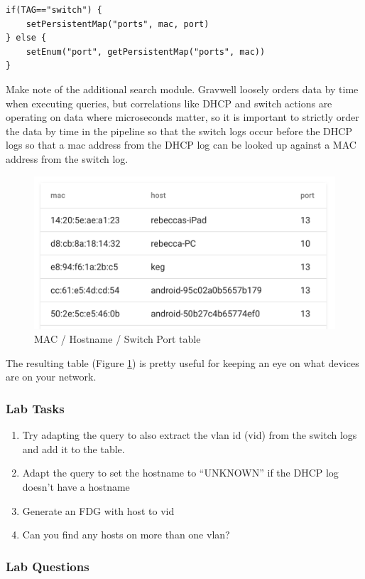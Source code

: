 \begin{Verbatim}[breaklines=true]
if(TAG=="switch") {
    setPersistentMap("ports", mac, port)
} else {
    setEnum("port", getPersistentMap("ports", mac))
}
\end{Verbatim}

Make note of the additional  search module.  Gravwell
loosely orders data by time when executing queries, but correlations like
DHCP and switch actions are operating on data where microseconds matter,
so it is important to strictly order the data by time in the pipeline
so that the switch logs occur before the DHCP logs so that a mac address
from the DHCP log can be looked up against a MAC address from the switch log.

\begin{figure}
	\includegraphics[width=0.6\linewidth]{images/mac-host-table.png}
	\caption{MAC / Hostname / Switch Port table}
	\label{fig:mac-host-table}
\end{figure}

The resulting table (Figure \ref{fig:mac-host-table}) is pretty useful for keeping an eye on what devices are on your network.

\subsubsection{Lab Tasks}

\begin{enumerate}
\item
  Try adapting the query to also extract the vlan id (vid) from the
  switch logs and add it to the table.
\item
  Adapt the query to set the hostname to ``UNKNOWN'' if the DHCP log
  doesn't have a hostname
\item
  Generate an FDG with host to vid
\item
  Can you find any hosts on more than one vlan?
\end{enumerate}


\subsubsection{Lab Questions}

